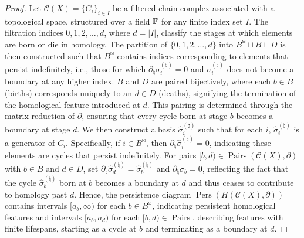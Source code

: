 \begin{proof}
	Let $\mathcal{C}(X) = \{C_{i}\}_{i \in I}$ be a filtered chain complex associated with
	a topological space, structured over a field ${\mathbb{F}}$ for any finite index
	set $I$. The filtration indices ${0, 1, 2, \ldots, d}$, where $d = \vert I \vert$,
	classify the stages at which elements are born or die in homology. The
	partition of $\{0, 1, 2, \ldots, d\}$ into $B^{\Join} \sqcup B \sqcup D$ is then constructed such that $B^{\Join}$ contains indices corresponding to elements that persist indefinitely, i.e., those for which $\partial_{\natural}\sigma^{(\natural)}_{i} = 0$ and $\sigma^{(\natural)}_{i}$ does not become a boundary at any higher index. $B$ and $D$ are paired bijectively, where each $b \in B$ (births) corresponds uniquely to an $d \in D$ (deaths), signifying the termination of the homological feature introduced at $d$. This pairing is determined through the matrix reduction of $\partial$, ensuring that every cycle born at stage $b$ becomes a boundary at stage $d$. We then construct a basis ${\hat{\sigma}^{(\natural)}_i}$ such that for each $i$, $\hat{\sigma}^{(\natural)}
	_{i}$ is a generator of $C_{i}$. Specifically, if $i \in B^{\Join}$, then
	$\partial_{\natural}\hat{\sigma}^{(\natural)}_{i} = 0$, indicating these elements are cycles that persist
	indefinitely. For pairs $[b, d) \in \operatorname{Pairs}(\mathcal{C}(X), \partial)$
	with $b \in B$ and $d \in D$, set $\partial_{\natural}\hat{\sigma}^{(\natural)}_{d} = \hat{\sigma}^{(\natural)}_{b}$
	and $\partial_{\natural}\hat{\sigma}_{b} = 0$, reflecting the fact that the cycle
	$\hat{\sigma}^{(\natural)}_{b}$ born at $b$ becomes a boundary at $d$ and thus ceases to
	contribute to homology past $d$. Hence, the persistence diagram $\operatorname{Pers}(H(\mathcal{C}(X), \partial))$ contains
	intervals $[a_{b}, \infty)$ for each $b \in B^{\Join}$, indicating persistent
	homological features and intervals $[a_{b}, a_{d})$ for each
	$[b, d) \in \operatorname{Pairs}$, describing features with finite lifespans,
	starting as a cycle at $b$ and terminating as a boundary at $d$.
\end{proof}

